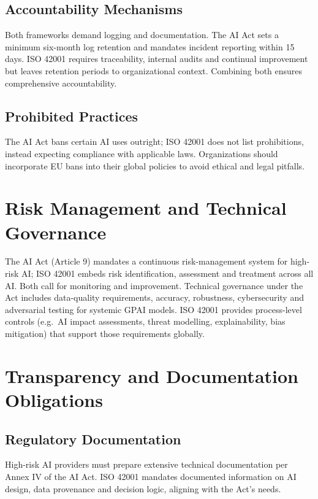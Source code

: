 \documentclass{article}
\begin{document}
\subsection{Accountability Mechanisms}
Both frameworks demand logging and documentation. The AI Act sets a minimum six-month log retention and mandates incident reporting within 15 days. ISO 42001 requires traceability, internal audits and continual improvement but leaves retention periods to organizational context. Combining both ensures comprehensive accountability.

\subsection{Prohibited Practices}
The AI Act bans certain AI uses outright; ISO 42001 does not list prohibitions, instead expecting compliance with applicable laws. Organizations should incorporate EU bans into their global policies to avoid ethical and legal pitfalls.

\section{Risk Management and Technical Governance}
The AI Act (Article 9) mandates a continuous risk-management system for high-risk AI; ISO 42001 embeds risk identification, assessment and treatment across all AI. Both call for monitoring and improvement. Technical governance under the Act includes data-quality requirements, accuracy, robustness, cybersecurity and adversarial testing for systemic GPAI models. ISO 42001 provides process-level controls (e.g.\ AI impact assessments, threat modelling, explainability, bias mitigation) that support those requirements globally.

\section{Transparency and Documentation Obligations}
\subsection{Regulatory Documentation}
High-risk AI providers must prepare extensive technical documentation per Annex IV of the AI Act. ISO 42001 mandates documented information on AI design, data provenance and decision logic, aligning with the Act’s needs.
\end{document}
